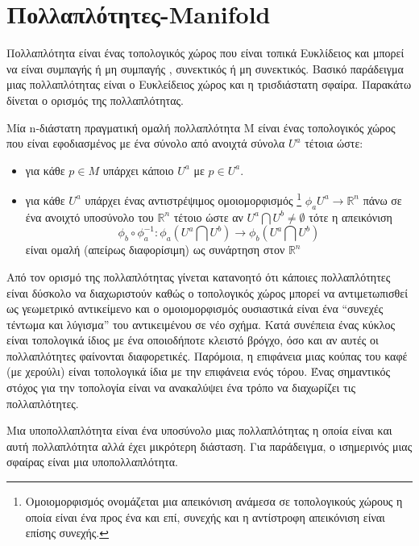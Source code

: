\section{Πολλαπλότητες-\textlatin{Manifold}}

Πολλαπλότητα είναι ένας τοπολογικός χώρος που είναι τοπικά Ευκλίδειος και  μπορεί να είναι συμπαγής ή μη συμπαγής , συνεκτικός ή μη συνεκτικός. Βασικό παράδειγμα μιας πολλαπλότητας είναι ο Ευκλείδειος χώρος και η τρισδιάστατη σφαίρα. Παρακάτω δίνεται ο ορισμός της πολλαπλότητας.

\begin{definition}
Μία  \textlatin{n}-διάστατη πραγματική ομαλή πολλαπλότητα Μ είναι ένας τοπολογικός χώρος που είναι εφοδιασμένος με ένα σύνολο από ανοιχτά σύνολα $U^a$ τέτοια ώστε: 
\begin{itemize}
\item για κάθε $p \in M $ υπάρχει κάποιο $U^a$ με $p \in U^a$.
\item για κάθε $U^a$ υπάρχει ένας αντιστρέψιμος ομοιομορφισμός \footnote{Ομοιομορφισμός ονομάζεται μια απεικόνιση ανάμεσα σε τοπολογικούς χώρους η οποία είναι ένα προς ένα και επί, συνεχής και η αντίστροφη απεικόνιση είναι επίσης συνεχής.} $\phi_a U^a \rightarrow \mathbb{R}^n $ πάνω σε ένα ανοιχτό υποσύνολο του $\mathbb{R}^n$ τέτοιο ώστε αν $U^a \bigcap U^b \neq \emptyset $  τότε η απεικόνιση 
	\[ \phi_b \circ \phi_a ^{-1} :\phi_a (U^a \bigcap U^b) \rightarrow \phi_b(U^a \bigcap U^b)\]
είναι ομαλή (απείρως διαφορίσιμη) ως συνάρτηση στον $\mathbb{R}^n$
 \end{itemize}
\end{definition}

Από τον ορισμό της πολλαπλότητας γίνεται κατανοητό ότι κάποιες πολλαπλότητες είναι δύσκολο να διαχωριστούν καθώς ο τοπολογικός χώρος μπορεί να αντιμετωπισθεί ως γεωμετρικό  αντικείμενο και ο ομοιομορφισμός  ουσιαστικά είναι ένα “συνεχές τέντωμα και λύγισμα” του αντικειμένου σε νέο σχήμα. Κατά συνέπεια ένας κύκλος είναι τοπολογικά ίδιος με ένα οποιοδήποτε κλειστό βρόγχο, όσο και αν αυτές οι πολλαπλότητες φαίνονται διαφορετικές. Παρόμοια, η επιφάνεια μιας κούπας του καφέ (με χερούλι)  είναι τοπολογικά ίδια με την επιφάνεια ενός  τόρου. Ένας σημαντικός στόχος για την τοπολογία  είναι να ανακαλύψει ένα τρόπο να διαχωρίζει τις πολλαπλότητες.

Μια υποπολλαπλότητα είναι ένα υποσύνολο μιας πολλαπλότητας η οποία είναι και αυτή πολλαπλότητα αλλά έχει μικρότερη διάσταση. Για παράδειγμα, ο ισημερινός μιας σφαίρας είναι μια υποπολλαπλότητα.

 